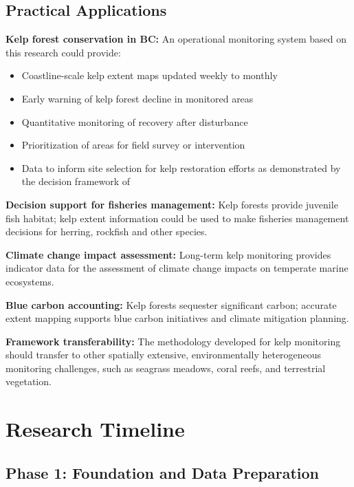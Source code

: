 \documentclass[12pt,oneside]{book}
\begin{document}
\section{Practical Applications}
\label{sec:practical-applications}

\textbf{Kelp forest conservation in BC:} An operational monitoring system based on this research could provide:
\begin{itemize}
    \item Coastline-scale kelp extent maps updated weekly to monthly
    \item Early warning of kelp forest decline in monitored areas
    \item Quantitative monitoring of recovery after disturbance
    \item Prioritization of areas for field survey or intervention
    \item Data to inform site selection for kelp restoration efforts as demonstrated by the decision framework of \citet{GiraldoOspina2024}
\end{itemize}

\textbf{Decision support for fisheries management:} Kelp forests provide juvenile fish habitat; kelp extent information could be used to make fisheries management decisions for herring, rockfish and other species.

\textbf{Climate change impact assessment:} Long-term kelp monitoring provides indicator data for the assessment of climate change impacts on temperate marine ecosystems.

\textbf{Blue carbon accounting:} Kelp forests sequester significant carbon; accurate extent mapping supports blue carbon initiatives and climate mitigation planning.

\textbf{Framework transferability:} The methodology developed for kelp monitoring should transfer to other spatially extensive, environmentally heterogeneous monitoring challenges, such as seagrass meadows, coral reefs, and terrestrial vegetation.


\chapter{Research Timeline}
\label{ch:timeline}

\section{Phase 1: Foundation and Data Preparation}
\end{document}
